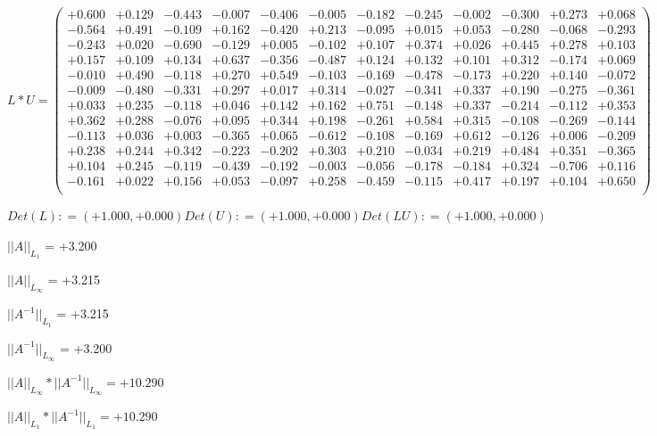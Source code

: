 \documentclass[9pt]{article}
\theoremstyle{plain}
\theoremstyle{definition}
\theoremstyle{remark}
\numberwithin{equation}{section}
\begin{document}
$L * U  = \left(
\begin{array}{
cccccccccccc}
+0.600 & +0.129 & -0.443 & -0.007 & -0.406 & -0.005 & -0.182 & -0.245 & -0.002 & -0.300 & +0.273 & +0.068 \\
-0.564 & +0.491 & -0.109 & +0.162 & -0.420 & +0.213 & -0.095 & +0.015 & +0.053 & -0.280 & -0.068 & -0.293 \\
-0.243 & +0.020 & -0.690 & -0.129 & +0.005 & -0.102 & +0.107 & +0.374 & +0.026 & +0.445 & +0.278 & +0.103 \\
+0.157 & +0.109 & +0.134 & +0.637 & -0.356 & -0.487 & +0.124 & +0.132 & +0.101 & +0.312 & -0.174 & +0.069 \\
-0.010 & +0.490 & -0.118 & +0.270 & +0.549 & -0.103 & -0.169 & -0.478 & -0.173 & +0.220 & +0.140 & -0.072 \\
-0.009 & -0.480 & -0.331 & +0.297 & +0.017 & +0.314 & -0.027 & -0.341 & +0.337 & +0.190 & -0.275 & -0.361 \\
+0.033 & +0.235 & -0.118 & +0.046 & +0.142 & +0.162 & +0.751 & -0.148 & +0.337 & -0.214 & -0.112 & +0.353 \\
+0.362 & +0.288 & -0.076 & +0.095 & +0.344 & +0.198 & -0.261 & +0.584 & +0.315 & -0.108 & -0.269 & -0.144 \\
-0.113 & +0.036 & +0.003 & -0.365 & +0.065 & -0.612 & -0.108 & -0.169 & +0.612 & -0.126 & +0.006 & -0.209 \\
+0.238 & +0.244 & +0.342 & -0.223 & -0.202 & +0.303 & +0.210 & -0.034 & +0.219 & +0.484 & +0.351 & -0.365 \\
+0.104 & +0.245 & -0.119 & -0.439 & -0.192 & -0.003 & -0.056 & -0.178 & -0.184 & +0.324 & -0.706 & +0.116 \\
-0.161 & +0.022 & +0.156 & +0.053 & -0.097 & +0.258 & -0.459 & -0.115 & +0.417 & +0.197 & +0.104 & +0.650 \\
\end{array}
\right)$ \newline 

$Det(L) :    = (+1.000,+0.000)     Det(U) :    = (+1.000,+0.000)     Det(LU) :    = (+1.000,+0.000)$

$||A||_{L_1}$  = +3.200

$||A||_{L_{\infty}}$ = +3.215

$||A^{-1}||_{L_1}$  = +3.215

$||A^{-1}||_{L_{\infty}}$ = +3.200

$||A||_{L_{\infty}} * ||A^{-1}||_{L_{\infty}} = +10.290$

$||A||_{L_1} * ||A^{-1}||_{L_1} = +10.290$
\end{document}
